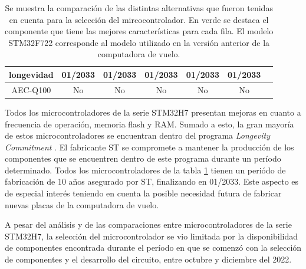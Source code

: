\begin{table}[htb]
\begin{tabular}{|c||c|c|c|c|c|c|}
        \hline
        longevidad & \cellcolor{green!25}01/2033 & \cellcolor{green!25}01/2033 & \cellcolor{green!25}01/2033 & \cellcolor{green!25}01/2033 & \cellcolor{green!25}01/2033\\
        \hline
        AEC-Q100 & No & No & No & No & No\\
        \hline       
    \end{tabular}
    \caption{Se muestra la comparación de las distintas alternativas que fueron tenidas en cuenta para la selección del mircocontrolador. En verde se destaca el componente que tiene las mejores características para cada fila. El modelo STM32F722 corresponde al modelo utilizado en la versión anterior de la computadora de vuelo.}
    \label{tab:comparacion_MCUs}
\end{table}

Todos los microcontroladores de la serie STM32H7 presentan mejoras en cuanto a frecuencia de operación, memoria flash y RAM. Sumado a esto, la gran mayoría de estos microcontroladores se encuentran dentro del programa \textit{Longevity Commitment} \cite{longevity_ST}. El fabricante ST se compromete a mantener la producción de los componentes que se encuentren dentro de este programa durante un período determinado. Todos los microcontroladores de la tabla \ref{tab:comparacion_MCUs} tienen un periódo de fabricación de 10 años asegurado por ST, finalizando en 01/2033. Este aspecto es de especial interés teniendo en cuenta la posible necesidad futura de fabricar nuevas placas de la computadora de vuelo.




A pesar del análisis y de las comparaciones entre microcontroladores de la serie STM32H7, la selección del microcontrolador se vio limitada por la disponibilidad de componentes encontrada durante el período en que se comenzó con la selección de componentes y el desarrollo del circuito, entre octubre y diciembre del 2022.

